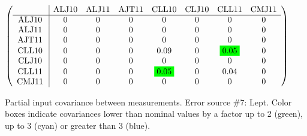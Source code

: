 \begin{table}[H]
\scriptsize
\begin{center}
\renewcommand{\arraystretch}{1.1}
\begin{math}\left(\begin{array}{c|ccccccc}
 & \mathrm{ALJ10} & 
\mathrm{ALJ11} & 
\mathrm{AJT11} & 
\mathrm{CLL10} & 
\mathrm{CLJ10} & 
\mathrm{CLL11} & 
\mathrm{CMJ11} \\
\hline
\mathrm{ALJ10} \hspace*{2pt} &  0 &  0 &  0 &  0 &  0 &  0 &  0 \\
\mathrm{ALJ11} \hspace*{2pt} &  0 &  0 &  0 &  0 &  0 &  0 &  0 \\
\mathrm{AJT11} \hspace*{2pt} &  0 &  0 &  0 &  0 &  0 &  0 &  0 \\
\mathrm{CLL10} \hspace*{2pt} &  0 &  0 &  0 &       0.09 &  0 &  \colorbox{Green1}{$      0.05$} &  0 \\
\mathrm{CLJ10} \hspace*{2pt} &  0 &  0 &  0 &  0 &  0 &  0 &  0 \\
\mathrm{CLL11} \hspace*{2pt} &  0 &  0 &  0 &  \colorbox{Green1}{$      0.05$} &  0 &       0.04 &  0 \\
\mathrm{CMJ11} \hspace*{2pt} &  0 &  0 &  0 &  0 &  0 &  0 &  0 \\
\end{array}\right)\end{math}
\caption{Partial input covariance between measurements. Error source \#7: Lept. Color boxes indicate covariances lower than nominal values by a factor up to 2 (green), up to 3 (cyan) or greater than 3 (blue).}
\renewcommand{\arraystretch}{1}
\end{center}
\end{table}
